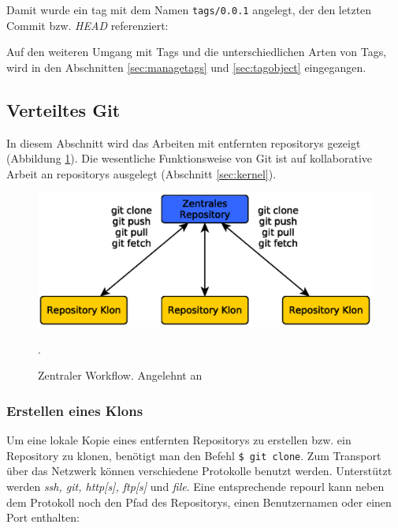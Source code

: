 
Damit wurde ein \gls{tag} mit dem Namen \texttt{tags/0.0.1} angelegt,
der den letzten Commit bzw. \textit{\gls{HEAD}} referenziert:


Auf den weiteren Umgang mit Tags und die unterschiedlichen Arten von Tags, wird
in den Abschnitten \ref{sec:managetags} und \ref{sec:tagobject} eingegangen.

\subsection{Verteiltes Git}\label{sec:distributed}
In diesem Abschnitt wird das Arbeiten mit entfernten \glspl{repository}
gezeigt (Abbildung \ref{fig:centralworkflow}). Die wesentliche Funktionsweise
von Git ist auf kollaborative Arbeit an \glspl{repository} ausgelegt (Abschnitt
\ref{sec:kernel}).

\begin{figure}[h]
  \centering
  \includegraphics[scale=0.70]{images/workflow.eps}
  \caption{Zentraler Workflow. Angelehnt an \cite[S.~138]{gitosp}}.
  \label{fig:centralworkflow}
\end{figure}

\subsubsection{Erstellen eines Klons}\label{sec:gitclone}
Um eine lokale Kopie eines entfernten Repositorys zu erstellen bzw. ein
Repository zu klonen, benötigt man den Befehl \texttt{\$ git clone}. Zum
Transport über das Netzwerk können verschiedene Protokolle benutzt werden.
Unterstützt werden \textit{ssh, git, http[s], ftp[s]} und \textit{file}. Eine
entsprechende \gls{repourl} kann neben dem Protokoll noch den Pfad des
Repositorys, einen Benutzernamen oder einen Port enthalten:


